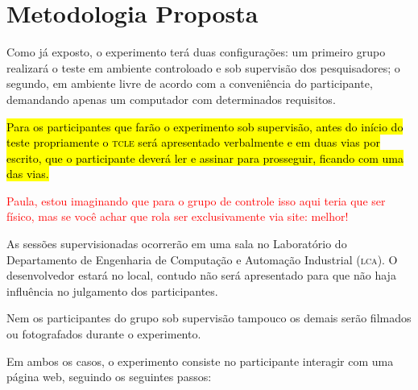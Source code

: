 \documentclass[a4paper,11pt,titlepage,singlespacing]{article}
\newcommand\todo[1]{\textcolor{red}{#1}}
\begin{document}
\section{Metodologia Proposta}

\noindent Como já exposto, o experimento terá duas configurações: um primeiro grupo realizará o teste em ambiente controloado e sob supervisão dos pesquisadores; o segundo, em ambiente livre de acordo com a conveniência do participante, demandando apenas um computador com determinados requisitos.

\hl{Para os participantes que farão o experimento sob supervisão, antes do início do teste propriamente o \textsc{tcle} será apresentado verbalmente e em duas vias por escrito, que o participante deverá ler e assinar para prosseguir, ficando com uma das vias.}

\todo{Paula, estou imaginando que para o grupo de controle isso aqui teria que ser físico, mas se você achar que rola ser exclusivamente via site: melhor!}

As sessões supervisionadas ocorrerão em uma sala no Laboratório do Departamento de Engenharia de Computação e Automação Industrial (\textsc{lca}). O desenvolvedor estará no local, contudo não será apresentado para que não haja influência no julgamento dos participantes.

Nem os participantes do grupo sob supervisão tampouco os demais serão filmados ou fotografados durante o experimento.

Em ambos os casos, o experimento consiste no participante interagir com uma página web, seguindo os seguintes passos:
\end{document}
